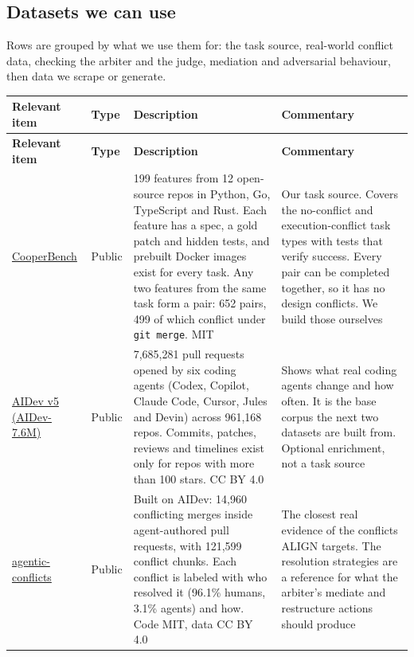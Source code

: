 \documentclass[11pt]{article}
\newcommand{\code}[1]{\texttt{#1}}
\begin{document}
\subsection*{Datasets we can use}

Rows are grouped by what we use them for: the task source, real-world conflict data, checking the arbiter and the judge, mediation and adversarial behaviour, then data we scrape or generate.

{\footnotesize
\begin{longtable}{@{}L{2.55cm}L{1.30cm}L{5.23cm}L{\dimexpr\linewidth-9.08cm-6\tabcolsep\relax}@{}}
\toprule
\textbf{Relevant item} & \textbf{Type} & \textbf{Description} & \textbf{Commentary} \\
\midrule
\endfirsthead
\toprule
\textbf{Relevant item} & \textbf{Type} & \textbf{Description} & \textbf{Commentary} \\
\midrule
\endhead
\bottomrule
\endlastfoot
\href{https://huggingface.co/datasets/CooperBench/cooperbench-dataset}{CooperBench} & Public & 199 features from 12 open-source repos in Python, Go, TypeScript and Rust. Each feature has a spec, a gold patch and hidden tests, and prebuilt Docker images exist for every task. Any two features from the same task form a pair: 652 pairs, 499 of which conflict under \code{git merge}. MIT & Our task source. Covers the no-conflict and execution-conflict task types with tests that verify success. Every pair can be completed together, so it has no design conflicts. We build those ourselves \\
\href{https://huggingface.co/datasets/hao-li/AIDev-7.6M}{AIDev v5 (AIDev-7.6M)} & Public & 7,685,281 pull requests opened by six coding agents (Codex, Copilot, Claude Code, Cursor, Jules and Devin) across 961,168 repos. Commits, patches, reviews and timelines exist only for repos with more than 100 stars. CC BY 4.0 & Shows what real coding agents change and how often. It is the base corpus the next two datasets are built from. Optional enrichment, not a task source \\
\href{https://github.com/gems-uff/agentic-conflicts}{agentic-conflicts} & Public & Built on AIDev: 14,960 conflicting merges inside agent-authored pull requests, with 121,599 conflict chunks. Each conflict is labeled with who resolved it (96.1\% humans, 3.1\% agents) and how. Code MIT, data CC BY 4.0 & The closest real evidence of the conflicts ALIGN targets. The resolution strategies are a reference for what the arbiter's mediate and restructure actions should produce \\

\end{longtable}}
\end{document}
